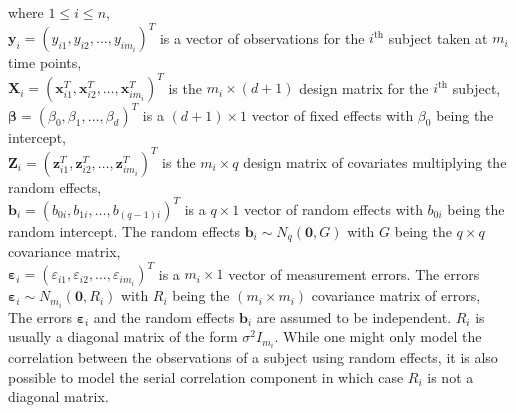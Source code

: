 where $1 \le i \le n$,\\
$\boldsymbol{y}_i = {(y_{i1}, y_{i2}, \ldots, y_{im_i})}^T$ is a vector of observations for the $i^\text{th}$ subject taken at $m_i$ time points,\\
$\boldsymbol{X}_i = {(\boldsymbol{x}_{i1}^T, \boldsymbol{x}_{i2}^T, \ldots, \boldsymbol{x}_{im_i}^T)}^T$ is the $m_i \times (d+1)$ design matrix for the $i^\text{th}$ subject,\\
$\boldsymbol{\beta} = {(\beta_0, \beta_1, \ldots, \beta_d)}^T$ is a $(d+1) \times 1$ vector of fixed effects with $\beta_0$ being the intercept,\\
$\boldsymbol{Z}_i = {(\boldsymbol{z}_{i1}^T, \boldsymbol{z}_{i2}^T, \ldots, \boldsymbol{z}_{im_i}^T)}^T$ is the $m_i \times q$ design matrix of covariates multiplying the random effects,\\
$\boldsymbol{b}_i = {(b_{0i}, b_{1i}, \ldots, b_{(q-1)i})}^T$ is a $q \times 1$ vector of random effects with $b_{0i}$ being the random intercept. The random effects $\boldsymbol{b}_i \sim N_q(\boldsymbol{0}, G)$ with $G$ being the $q \times q$ covariance matrix,\\ 
$\boldsymbol{\varepsilon}_{i} = {(\varepsilon_{i1}, \varepsilon_{i2}, \ldots, \varepsilon_{im_i})}^T$ is a $m_i \times 1$ vector of measurement errors. The errors $\boldsymbol{\varepsilon}_{i} \sim N_{m_i}(\boldsymbol{0}, R_i)$ with $R_i$ being the $(m_i \times m_i)$ covariance matrix of errors,\\

The errors $\boldsymbol{\varepsilon}_{i}$ and the random effects $\boldsymbol{b}_i$ are assumed to be independent. $R_i$ is usually a diagonal matrix of the form $\sigma^2I_{m_i}$. While one might only model the correlation between the observations of a subject using random effects, it is also possible to model the serial correlation component in which case $R_i$ is not a diagonal matrix.


